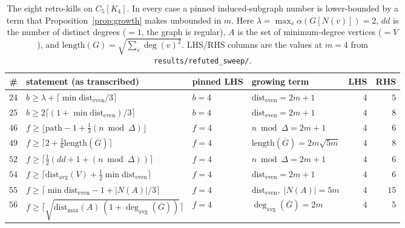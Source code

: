 \documentclass[10pt,a4paper]{article}
\theoremstyle{plain}
\theoremstyle{definition}
\newcommand{\ind}{\alpha}
\newcommand{\forestnum}{f}
\newcommand{\bipnum}{b}
\newcommand{\pathnum}{\mathrm{path}}
\newcommand{\de}{\mathrm{dist_{even}}}
\newcommand{\blow}[2]{#1[K_{#2}]}
\begin{document}
\begin{table}[t]
\centering
\small
\begin{tabular}{rlllrr}
\toprule
\# & statement (as transcribed) & pinned LHS & growing term & LHS & RHS \\
\midrule
$24$ & $\bipnum \ge \lambda + \lceil \min\de/3\rceil$ & $\bipnum = 4$ & $\de = 2m+1$ & $4$ & $5$\\
$25$ & $\bipnum \ge 2\lceil (1+\min\de)/3\rceil$ & $\bipnum = 4$ & $\de = 2m+1$ & $4$ & $8$\\
$46$ & $\forestnum \ge \lfloor \pathnum - 1 + \tfrac13(n \bmod \Delta)\rfloor$ & $\forestnum = 4$ & $n \bmod \Delta = 2m+1$ & $4$ & $6$\\
$49$ & $\forestnum \ge \lceil 2 + \tfrac16 \mathrm{length}(\overline{G})\rceil$ & $\forestnum = 4$ & $\mathrm{length}(\overline{G}) = 2m\sqrt{5m}$ & $4$ & $8$\\
$52$ & $\forestnum \ge \lceil \tfrac12(dd + 1 + (n \bmod \Delta))\rceil$ & $\forestnum = 4$ & $n \bmod \Delta = 2m+1$ & $4$ & $6$\\
$54$ & $\forestnum \ge \lceil \mathrm{dist_{avg}}(V) + \tfrac12\min\de \rceil$ & $\forestnum = 4$ & $\de = 2m+1$ & $4$ & $6$\\
$55$ & $\forestnum \ge \lceil \min\de - 1 + |N(A)|/3\rceil$ & $\forestnum = 4$ & $\de,\;|N(A)| = 5m$ & $4$ & $15$\\
$56$ & $\forestnum \ge \lceil \sqrt{\mathrm{dist_{max}}(A)\,(1+\deg_{\mathrm{avg}}(\overline{G}))}\rceil$ & $\forestnum = 4$ & $\deg_{\mathrm{avg}}(\overline{G}) = 2m$ & $4$ & $5$\\
\bottomrule
\end{tabular}
\caption{The eight retro-kills on $\blow{C_5}{4}$. In every case a pinned induced-subgraph number
is lower-bounded by a term that Proposition~\ref{prop:growth} makes unbounded in $m$. Here
$\lambda = \max_v \ind(G[N(v)]) = 2$, $dd$ is the number of distinct degrees ($=1$, the graph is
regular), $A$ is the set of minimum-degree vertices ($= V$), and
$\mathrm{length}(G) = \sqrt{\sum_v \deg(v)^2}$. LHS/RHS columns are the values at $m = 4$ from
\texttt{results/refuted\_sweep/}.}
\label{tab:retro}
\end{table}
\end{document}
